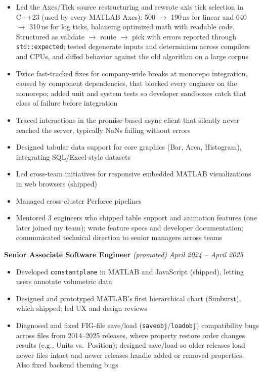 \documentclass{article}
\begin{document}
\begin{itemize}[leftmargin=*]
    \item Led the Axes/Tick source restructuring and rewrote axis tick selection in C++23 (used by every MATLAB Axes): 500 $\to$ 190\,ns for linear and 640 $\to$ 310\,ns for log ticks, balancing optimized math with readable code. Structured as validate $\to$ route $\to$ pick with errors reported through \texttt{std::expected}; tested degenerate inputs and determinism across compilers and CPUs, and diffed behavior against the old algorithm on a large corpus %
    \item Twice fast-tracked fixes for company-wide breaks at monorepo integration, caused by component dependencies, that blocked every engineer on the monorepo; added unit and system tests so developer sandboxes catch that class of failure before integration %
    \item Traced interactions in the promise-based async client that silently never reached the server, typically NaNs failing without errors %
    \item Designed tabular data support for core graphics (Bar, Area, Histogram), integrating SQL/Excel-style datasets %
    \item Led cross-team initiatives for responsive embedded MATLAB visualizations in web browsers (shipped) %
    \item Managed cross-cluster Perforce pipelines %
    \item Mentored 3 engineers who shipped table support and animation features (one later joined my team); wrote feature specs and developer documentation; communicated technical direction to senior managers across teams %
\end{itemize}

{\large \textbf{Senior Associate Software Engineer}} \textit{(promoted)} \hfill \textit{April 2024 -- April 2025}
\begin{itemize}[leftmargin=*]
    \item Developed \texttt{constantplane} in MATLAB and JavaScript (shipped), letting users annotate volumetric data %
    \item Designed and prototyped MATLAB's first hierarchical chart (Sunburst), which shipped; led UX and design reviews %
    \item Diagnosed and fixed FIG-file save/load (\texttt{saveobj}/\texttt{loadobj}) compatibility bugs across files from 2014--2025 releases, where property restore order changes results (e.g., Units vs.\ Position); designed save/load so older releases load newer files intact and newer releases handle added or removed properties. Also fixed backend theming bugs %
\end{itemize}
\end{document}
